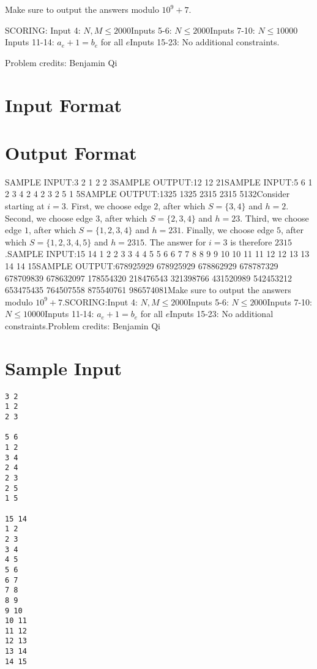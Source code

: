 \documentclass[12pt]{article}
\begin{document}
Make sure to output the answers modulo $10^9+7$.

SCORING:
Input 4: $N,M\le 2000$Inputs 5-6: $N\le 2000$Inputs 7-10: $N\le 10000$Inputs 11-14: $a_e+1=b_e$ for all $e$Inputs 15-23: No additional constraints.


Problem credits: Benjamin Qi



\section*{Input Format}


\section*{Output Format}
SAMPLE INPUT:3 2
1 2
2 3SAMPLE OUTPUT:12
12
21SAMPLE INPUT:5 6
1 2
3 4
2 4
2 3
2 5
1 5SAMPLE OUTPUT:1325
1325
2315
2315
5132Consider starting at $i=3$. First, we choose edge $2$, after which
$S = \{3, 4\}$ and $h = 2$. Second, we choose edge $3$, after which
$S = \{2, 3, 4\}$ and $h = 23$. Third, we choose edge $1$, after which
$S = \{1, 2, 3, 4\}$ and $h = 231$. Finally, we choose edge $5$, after which
$S = \{1, 2, 3, 4, 5\}$ and $h = 2315$. The answer for $i=3$ is therefore
$2315$.SAMPLE INPUT:15 14
1 2
2 3
3 4
4 5
5 6
6 7
7 8
8 9
9 10
10 11
11 12
12 13
13 14
14 15SAMPLE OUTPUT:678925929
678925929
678862929
678787329
678709839
678632097
178554320
218476543
321398766
431520989
542453212
653475435
764507558
875540761
986574081Make sure to output the answers modulo $10^9+7$.SCORING:Input 4: $N,M\le 2000$Inputs 5-6: $N\le 2000$Inputs 7-10: $N\le 10000$Inputs 11-14: $a_e+1=b_e$ for all $e$Inputs 15-23: No additional constraints.Problem credits: Benjamin Qi

\section*{Sample Input}
\begin{verbatim}
3 2
1 2
2 3

5 6
1 2
3 4
2 4
2 3
2 5
1 5

15 14
1 2
2 3
3 4
4 5
5 6
6 7
7 8
8 9
9 10
10 11
11 12
12 13
13 14
14 15
\end{verbatim}
\end{document}
